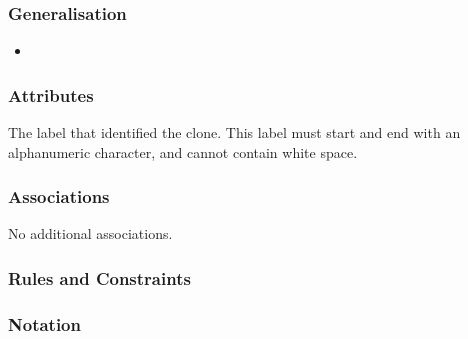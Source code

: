 \subsubsection{Generalisation}

\begin{itemize}
\item {}
\end{itemize}

\subsubsection{Attributes}

\begin{attributes}
   The label that identified the clone. This
  label must start and end with an alphanumeric character, and cannot
  contain white space.
\end{attributes}

\subsubsection{Associations}

No additional associations.

\subsubsection{Rules and Constraints}

\begin{valrules}
\end{valrules}


\subsubsection{Notation}

